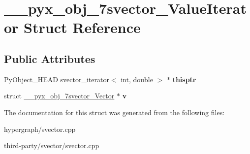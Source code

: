 \hypertarget{struct____pyx__obj__7svector__ValueIterator}{
\section{\_\-\_\-pyx\_\-obj\_\-7svector\_\-ValueIterator Struct Reference}
\label{struct____pyx__obj__7svector__ValueIterator}
}
\subsection*{Public Attributes}
\begin{DoxyCompactItemize}
\item 
\hypertarget{struct____pyx__obj__7svector__ValueIterator_a84c4b6a57426d1026bc9fee500e1f0bc}{
PyObject\_\-HEAD svector\_\-iterator$<$ int, double $>$ $\ast$ {\bfseries thisptr}}
\label{struct____pyx__obj__7svector__ValueIterator_a84c4b6a57426d1026bc9fee500e1f0bc}

\item 
\hypertarget{struct____pyx__obj__7svector__ValueIterator_ade8a9afa5e7ac991c03aa06401601931}{
struct \hyperlink{struct____pyx__obj__7svector__Vector}{\_\-\_\-pyx\_\-obj\_\-7svector\_\-Vector} $\ast$ {\bfseries v}}
\label{struct____pyx__obj__7svector__ValueIterator_ade8a9afa5e7ac991c03aa06401601931}

\end{DoxyCompactItemize}


The documentation for this struct was generated from the following files:\begin{DoxyCompactItemize}
\item 
hypergraph/svector.cpp\item 
third-\/party/svector/svector.cpp\end{DoxyCompactItemize}
